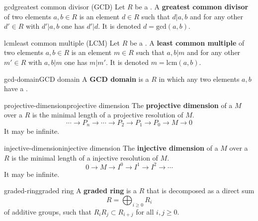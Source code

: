 \begin{topic}{gcd}{greatest common divisor (GCD)}
    Let $R$ be a . A \textbf{greatest common divisor} of two elements $a, b \in R$ is an element $d \in R$ such that $d | a, b$ and for any other $d' \in R$ with $d' | a, b$ one has $d' | d$. It is denoted $d = \text{gcd}(a, b)$.
\end{topic}

\begin{topic}{lcm}{least common multiple (LCM)}
    Let $R$ be a . A \textbf{least common multiple} of two elements $a, b \in R$ is an element $m \in R$ such that $a, b | m$ and for any other $m' \in R$ with $a, b | m$ one has $m | m'$. It is denoted $m = \text{lcm}(a, b)$.
\end{topic}

\begin{topic}{gcd-domain}{GCD domain}
    A \textbf{GCD domain} is a  $R$ in which any two elements $a, b$ have a .
\end{topic}

\begin{topic}{projective-dimension}{projective dimension}
    The \textbf{projective dimension} of a  $M$ over a  $R$ is the minimal length of a projective resolution of $M$.
    \[ \cdots \to P_n \to \cdots \to P_2 \to P_1 \to P_0 \to M \to 0 \]
    It may be infinite.
\end{topic}

\begin{topic}{injective-dimension}{injective dimension}
    The \textbf{injective dimension} of a  $M$ over a  $R$ is the minimal length of a injective resolution of $M$.
    \[ 0 \to M \to I^0 \to I^1 \to I^2 \to \cdots \]
    It may be infinite.
\end{topic}


\begin{topic}{graded-ring}{graded ring}
    A \textbf{graded ring} is a  $R$ that is decomposed as a direct sum
    \[ R = \bigoplus_{i \ge 0} R_i \]
    of additive groups, such that $R_i R_j \subset R_{i + j}$ for all $i, j \ge 0$.
\end{topic}

